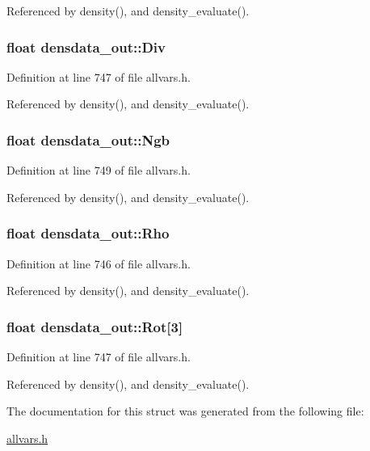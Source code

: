 Referenced by density(), and density\_\-evaluate().

\hypertarget{structdensdata__out_af3c2ce61474da5764ac1b50155c0aa7e}{
\subsubsection[{Div}]{\setlength{\rightskip}{0pt plus 5cm}float {\bf densdata\_\-out::Div}}}
\label{structdensdata__out_af3c2ce61474da5764ac1b50155c0aa7e}


Definition at line 747 of file allvars.h.



Referenced by density(), and density\_\-evaluate().

\hypertarget{structdensdata__out_ad78ddc3f9c8fb77b2e98f04d5cd2dfb4}{
\subsubsection[{Ngb}]{\setlength{\rightskip}{0pt plus 5cm}float {\bf densdata\_\-out::Ngb}}}
\label{structdensdata__out_ad78ddc3f9c8fb77b2e98f04d5cd2dfb4}


Definition at line 749 of file allvars.h.



Referenced by density(), and density\_\-evaluate().

\hypertarget{structdensdata__out_a7a4edc5de1283464a658fb089594d11c}{
\subsubsection[{Rho}]{\setlength{\rightskip}{0pt plus 5cm}float {\bf densdata\_\-out::Rho}}}
\label{structdensdata__out_a7a4edc5de1283464a658fb089594d11c}


Definition at line 746 of file allvars.h.



Referenced by density(), and density\_\-evaluate().

\hypertarget{structdensdata__out_a748be7d0e50757980389fb667d6d022b}{
\subsubsection[{Rot}]{\setlength{\rightskip}{0pt plus 5cm}float {\bf densdata\_\-out::Rot}\mbox{[}3\mbox{]}}}
\label{structdensdata__out_a748be7d0e50757980389fb667d6d022b}


Definition at line 747 of file allvars.h.



Referenced by density(), and density\_\-evaluate().



The documentation for this struct was generated from the following file:\begin{DoxyCompactItemize}
\item 
\hyperlink{allvars_8h}{allvars.h}\end{DoxyCompactItemize}
